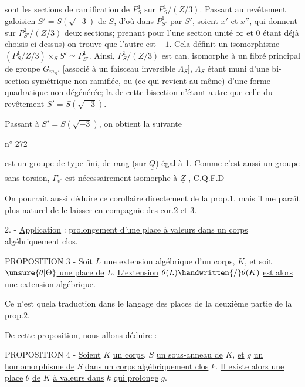 sont les sections de ramification de $P^1_S$ sur $P^1_S/(Z/3)$. Passant au revêtement galoisien $S'=S(\sqrt{-3})$ de $S$, d'où dans $P^1_{S'}$   par $\overline{S'}$, soient $x'$ et $x''$, qui donnent sur $P^1_{S'}/(Z/3)$ deux sections; prenant pour l'une   section unité  $\infty$ et $0$ étant déjà choisis ci-dessus) on trouve que l'autre est $-1$. Cela définit un isomorphisme $(P^1_S/Z/3)\times_S S'\simeq P^1_{S'}$. Ainsi, $P^1_S/(Z/3)$ est can. isomorphe à un fibré principal de groupe $G_{m_S}$, [associé à un faisceau inversible $\Lambda_S$], $\Lambda_S$ étant muni d'une bi-section  symétrique non ramifiée, ou (ce qui revient au même) d'une forme quadratique non dégénérée; la   de cette bisection n'étant autre que celle du revêtement $S'=S(\sqrt{-3})$.

Passant à $S'=S(\sqrt{-3})$, on obtient la  suivante

 \hfill n° 272

est un groupe de type fini, de rang (sur $\underline{\underline Q}$) égal à 1. Comme c'est aussi un groupe sans torsion, $\Gamma_{v'}$ est nécessairement isomorphe à $\underline{\underline Z}$ , C.Q.F.D

\handwritten{[}On pourrait aussi déduire ce corollaire directement de la prop.1, mais il me paraît plus naturel de le laisser en compagnie des cor.2 et 3\handwritten{]}.

2. - \uline{Application} : \uline{prolongement d'une place à valeurs dans un corps algébriquement clos}.

PROPOSITION 3 - \uline{Soit} $L$ \uline{une extension algébrique d'un corps}, $K$, \uline{et soit $\unsure{\theta|\Theta}$ une place de} $L$. \uline{L'extension} $\theta(L)\handwritten{/}\theta(K)$ \uline{est alors une extension algébrique.}

Ce n'est que\handwritten{\,}la traduction dans le langage des places de la deuxième partie de la prop.2.

De cette proposition, nous allons déduire :

PROPOSITION 4 - \uline{Soient} $K$ \uline{un corps}, $S$ \uline{un sous-anneau de} $K$, \uline{et} $g$ \uline{un homomorphisme de} $S$ \uline{dans un corps algébriquement clos} $k$. \uline{Il existe alors une place} $\theta$ \uline{de} $K$ \uline{à valeurs dans} $k$ \uline{qui prolonge} $g$.

